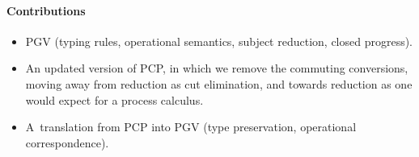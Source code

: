 \documentclass[main.tex]{subfiles}
\begin{document}
\paragraph*{Contributions}
\begin{itemize}
\item PGV (typing rules, operational semantics, subject reduction, closed progress).
\item An updated version of PCP, in which we remove the commuting conversions, moving away from reduction as cut elimination, and towards reduction as one would expect for a process calculus.
\item A~translation from PCP into PGV (type preservation, operational correspondence).
\end{itemize}
\end{document}

